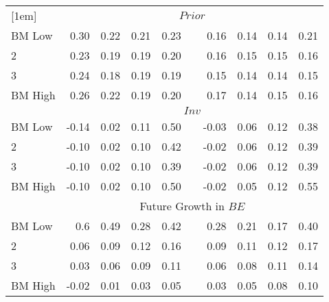\begin{table}[!ht]
\begin{tabular}{lrrrrcrrrr}
[1em]
                          & \multicolumn{9}{c}{$Prior$} \\
  BM Low                  &  0.30 &  0.22 &  0.21 &  0.23 & &  0.16 &  0.14 &  0.14 &  0.21 \\
  2                       &  0.23 &  0.19 &  0.19 &  0.20 & &  0.16 &  0.15 &  0.15 &  0.16 \\
  3                       &  0.24 &  0.18 &  0.19 &  0.19 & &  0.15 &  0.14 &  0.14 &  0.15 \\
  BM High                 &  0.26 &  0.22 &  0.19 &  0.20 & &  0.17 &  0.14 &  0.15 &  0.16 \\
[1em]
                          & \multicolumn{9}{c}{$Inv$} \\
  BM Low                  & -0.14 &  0.02 &  0.11 &  0.50 & & -0.03 &  0.06 &  0.12 &  0.38 \\
  2                       & -0.10 &  0.02 &  0.10 &  0.42 & & -0.02 &  0.06 &  0.12 &  0.39 \\
  3                       & -0.10 &  0.02 &  0.10 &  0.39 & & -0.02 &  0.06 &  0.12 &  0.39 \\
  BM High                 & -0.10 &  0.02 &  0.10 &  0.50 & & -0.02 &  0.05 &  0.12 &  0.55 \\
[1em]
                          & \multicolumn{9}{c}{Future Growth in $BE$} \\
  BM Low                  &  0.6  &  0.49 &  0.28 &  0.42 & &  0.28 &  0.21 &  0.17 &  0.40 \\
  2                       &  0.06 &  0.09 &  0.12 &  0.16 & &  0.09 &  0.11 &  0.12 &  0.17 \\
  3                       &  0.03 &  0.06 &  0.09 &  0.11 & &  0.06 &  0.08 &  0.11 &  0.14 \\
  BM High                 & -0.02 &  0.01 &  0.03 &  0.05 & &  0.03 &  0.05 &  0.08 &  0.10 \\
[1em]
  \bottomrule
\end{tabular}
\label{tbl:BM_Inv_future_BE}
\end{table}
